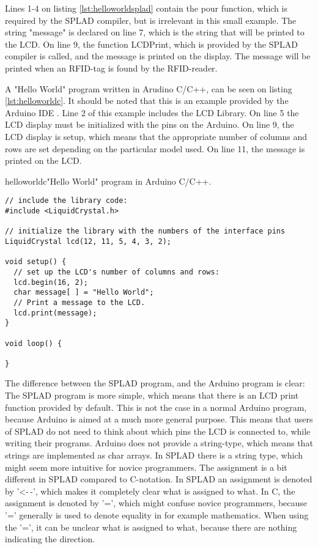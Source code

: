 Lines 1-4 on listing \ref{lst:helloworldsplad} contain the pour function, which is required by the SPLAD compiler, but is irrelevant in this small example. The string "message" is declared on line 7, which is the string that will be printed to the LCD. On line 9, the function LCDPrint, which is provided by the SPLAD compiler is called, and the message is printed on the display. The message will be printed when an RFID-tag is found by the RFID-reader.

A "Hello World" program written in Arudino C/C++, can be seen on listing \ref{lst:helloworldc}. It should be noted that this is an example provided by the Arduino IDE \citep{LCDtut}. Line 2 of this example includes the LCD Library. On line 5 the LCD display must be initialized with the pins on the Arduino. On line 9, the LCD display is setup, which means that the appropriate number of columns and rows are set depending on the particular model used. On line 11, the message is printed on the LCD.
 
\begin{code}{helloworldc}{"Hello World" program in Arduino C/C++.}
\begin{lstlisting}
// include the library code:
#include <LiquidCrystal.h>

// initialize the library with the numbers of the interface pins
LiquidCrystal lcd(12, 11, 5, 4, 3, 2);

void setup() {
  // set up the LCD's number of columns and rows: 
  lcd.begin(16, 2);
  char message[ ] = "Hello World";
  // Print a message to the LCD.
  lcd.print(message);
}

void loop() {

}
\end{lstlisting}
\end{code}
The difference between the SPLAD program, and the Arduino program is clear: The SPLAD program is more simple, which means that there is an LCD print function provided by default. This is not the case in a normal Arduino program, because Arduino is aimed at a much more general purpose. This means that users of SPLAD do not need to think about which pins the LCD is connected to, while writing their programs. Arduino does not provide a string-type, which means that strings are implemented as char arrays. In SPLAD there is a string type, which might seem more intuitive for novice programmers. The assignment is a bit different in SPLAD compared to C-notation. In SPLAD an assignment is denoted by '<-$\,$-', which makes it completely clear what is assigned to what. In C, the assignment is denoted by '=', which might confuse novice programmers, because '=' generally is used to denote equality in for example mathematics. When using the '=', it can be unclear what is assigned to what, because there are nothing indicating the direction.

